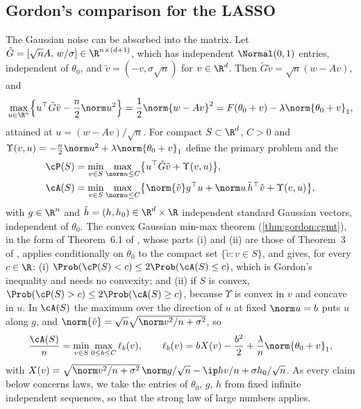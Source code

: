\begin{refsection}
\subsection{Gordon's comparison for the LASSO}\label{sec:lasso:cgmt}

The Gaussian noise can be absorbed into the matrix. Let $\tilde G=[\sqrt nA,\,w/\sigma]\in\R^{n\times(d+1)}$, which has independent $\Normal(0,1)$ entries, independent of $\theta_0$, and $\tilde v=(-v,\sigma\sqrt n)$ for $v\in\R^d$. Then $\tilde G\tilde v=\sqrt n(w-Av)$, and
\begin{equation}\label{eq:lasso:dual}
\max_{u\in\R^n}\Bigl\{u^\top\tilde G\tilde v-\frac n2\norm u^2\Bigr\}=\frac12\norm{w-Av}^2=F(\theta_0+v)-\lambda\norm{\theta_0+v}_1,
\end{equation}
attained at $u=(w-Av)/\sqrt n$. For compact $S\subset\R^d$, $C>0$ and $\Upsilon(v,u)=-\frac n2\norm u^2+\lambda\norm{\theta_0+v}_1$ define the primary problem and the 
\begin{align*}
\cP(S)&=\min_{v\in S}\max_{\norm u\le C}\bigl\{u^\top\tilde G\tilde v+\Upsilon(v,u)\bigr\},\\
\cA(S)&=\min_{v\in S}\max_{\norm u\le C}\bigl\{\norm{\tilde v}g^\top u+\norm u\,\tilde h^\top\tilde v+\Upsilon(v,u)\bigr\},
\end{align*}
with $g\in\R^n$ and $\tilde h=(h,h_0)\in\R^d\times\R$ independent standard Gaussian vectors, independent of $\theta_0$. The convex Gaussian min-max theorem (\cref{thm:gordon:cgmt}), in the form of Theorem~6.1 of \textcite{ThrampoulidisAbbasiHassibi2018}, whose parts (i) and (ii) are those of Theorem~3 of \textcite{ThrampoulidisOymakHassibi2015}, applies conditionally on $\theta_0$ to the compact set $\{\tilde v:v\in S\}$, and gives, for every $c\in\R$:
\textup{(i)} $\Prob(\cP(S)<c)\le2\Prob(\cA(S)\le c)$, which is Gordon's inequality \parencite{Gordon1985,Gordon1988} and needs no convexity; and
\textup{(ii)} if $S$ is convex, $\Prob(\cP(S)>c)\le2\Prob(\cA(S)\ge c)$, because $\Upsilon$ is convex in $v$ and concave in $u$.
In $\cA(S)$ the maximum over the direction of $u$ at fixed $\norm u=b$ puts $u$ along $g$, and $\norm{\tilde v}=\sqrt n\sqrt{\norm v^2/n+\sigma^2}$, so
\begin{equation}\label{eq:lasso:lb}
\frac{\cA(S)}n=\min_{v\in S}\max_{0\le b\le C}\ell_b(v),\qquad\ell_b(v)=bX(v)-\frac{b^2}2+\frac\lambda n\norm{\theta_0+v}_1,
\end{equation}
with $X(v)=\sqrt{\norm v^2/n+\sigma^2}\,\norm g/\sqrt n-\ip hv/n+\sigma h_0/\sqrt n$. As every claim below concerns laws, we take the entries of $\theta_0$, $g$, $h$ from fixed infinite independent sequences, so that the strong law of large numbers applies.


\end{refsection}
